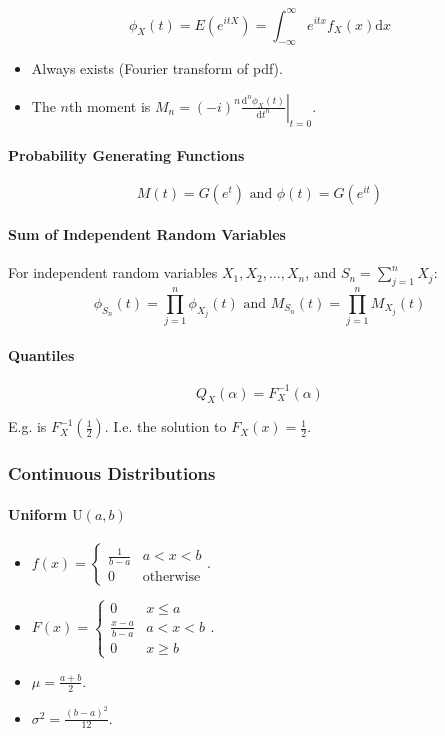 \documentclass[twocolumn,english]{article}
\let\emph\relax
\begin{document}
\[
\phi_{X}\left(t\right)=E\left(e^{itX}\right)=\int_{-\infty}^{\infty}e^{itx}f_{X}\left(x\right)\text{d}x
\]
\begin{itemize}
\item Always exists (Fourier transform of pdf).
\item The $n$th moment is $\left.M_{n}=\left(-i\right)^{n}\frac{\text{d}^{n}\phi_{X}\left(t\right)}{\text{d}t^{n}}\right\vert _{t=0}$.
\end{itemize}

\paragraph{Probability Generating Functions}

\[
M\left(t\right)=G\left(e^{t}\right)\text{ and }\phi\left(t\right)=G\left(e^{it}\right)
\]

\paragraph{Sum of Independent Random Variables}

For independent random variables $X_{1},X_{2},\dots,X_{n}$, and $S_{n}=\sum_{j=1}^{n}X_{j}$:
\[
\phi_{S_{n}}\left(t\right)=\prod_{j=1}^{n}\phi_{X_{j}}\left(t\right)\text{ and }M_{S_{n}}\left(t\right)=\prod_{j=1}^{n}M_{X_{j}}\left(t\right)
\]

\paragraph{Quantiles}

\[
Q_{X}\left(\alpha\right)=F_{X}^{-1}\left(\alpha\right)
\]

E.g. \emph{median} is $F_{X}^{-1}\left(\frac{1}{2}\right)$. I.e.
the solution to $F_{X}\left(x\right)=\frac{1}{2}$.

\subsubsection{Continuous Distributions}

\paragraph{Uniform $\text{U}\left(a,b\right)$}
\begin{itemize}
\item $f\left(x\right)=\begin{cases}
\frac{1}{b-a} & a<x<b\\
0 & \text{otherwise}
\end{cases}$.
\item $F\left(x\right)=\begin{cases}
0 & x\leq a\\
\frac{x-a}{b-a} & a<x<b\\
0 & x\geq b
\end{cases}$.
\item $\mu=\frac{a+b}{2}$.
\item $\sigma^{2}=\frac{\left(b-a\right)^{2}}{12}$.
\end{itemize}
\end{document}
